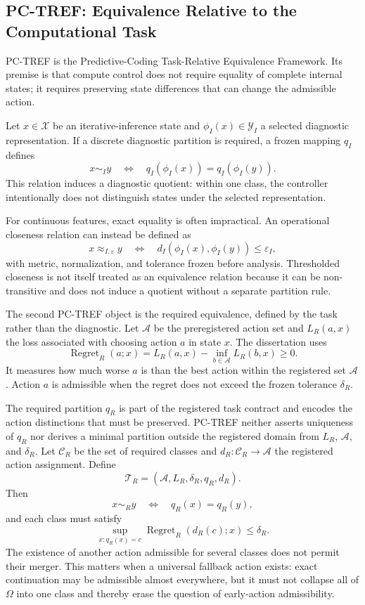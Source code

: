 \subsection{PC-TREF: Equivalence Relative to the Computational Task}
\label{sec:theory-pc-tref}

PC-TREF is the Predictive-Coding Task-Relative Equivalence Framework. Its premise is
that compute control does not require equality of complete internal states; it requires
preserving state differences that can change the admissible action.

Let $x\in\mathcal X$ be an iterative-inference state and
$\phi_I(x)\in\mathcal Y_I$ a selected diagnostic representation. If a discrete
diagnostic partition is required, a frozen mapping $q_I$ defines
\[
  x\sim_I y
  \quad\Longleftrightarrow\quad
  q_I\!\left(\phi_I(x)\right)=q_I\!\left(\phi_I(y)\right).
\]
This relation induces a diagnostic quotient: within one class, the controller
intentionally does not distinguish states under the selected representation.

For continuous features, exact equality is often impractical. An operational
closeness relation can instead be defined as
\[
  x\approx_{I,\varepsilon}y
  \quad\Longleftrightarrow\quad
  d_I\!\left(\phi_I(x),\phi_I(y)\right)\leq\varepsilon_I,
\]
with metric, normalization, and tolerance frozen before analysis. Thresholded closeness
is not itself treated as an equivalence relation because it can be non-transitive and
does not induce a quotient without a separate partition rule.

The second PC-TREF object is the required equivalence, defined by the task rather than
the diagnostic. Let $\mathcal A$ be the preregistered action set and $L_R(a,x)$ the
loss associated with choosing action $a$ in state $x$. The dissertation uses
\[
  \operatorname{Regret}_R(a;x)
  =L_R(a,x)-\inf_{b\in\mathcal A}L_R(b,x)\geq0.
\]
It measures how much worse $a$ is than the best action within the registered set
$\mathcal A$. Action $a$ is admissible when the regret does not exceed the frozen
tolerance $\delta_R$.

The required partition $q_R$ is part of the registered task contract and encodes the
action distinctions that must be preserved. PC-TREF neither asserts uniqueness of
$q_R$ nor derives a minimal partition outside the registered domain from $L_R$,
$\mathcal A$, and $\delta_R$. Let $\mathcal C_R$ be the set of required classes and
$d_R:\mathcal C_R\rightarrow\mathcal A$ the registered action assignment. Define
\[
  \mathcal T_R=(\mathcal A,L_R,\delta_R,q_R,d_R).
\]
Then
\[
  x\sim_R y\quad\Longleftrightarrow\quad q_R(x)=q_R(y),
\]
and each class must satisfy
\[
  \sup_{x:q_R(x)=c}
  \operatorname{Regret}_R\!\left(d_R(c);x\right)\leq\delta_R.
\]
The existence of another action admissible for several classes does not permit their
merger. This matters when a universal fallback action exists: exact continuation may be
admissible almost everywhere, but it must not collapse all of $\Omega$ into one class
and thereby erase the question of early-action admissibility.

